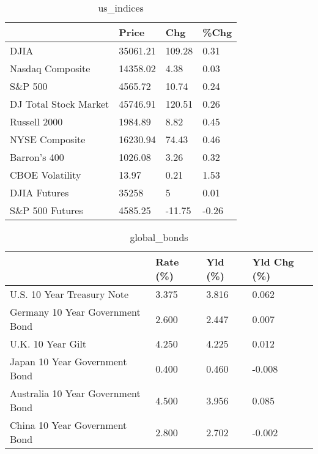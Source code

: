 \documentclass{article}%
\begin{document}
%


\begin{table}[htbp]%
\caption{us\_indices}%
\centering%
\begin{adjustbox}{width=1\textwidth}%
\begin{tabular}{llll}
\toprule
                      &    Price &    Chg &  \%Chg \\
\midrule
                 DJIA & 35061.21 & 109.28 &  0.31 \\
     Nasdaq Composite & 14358.02 &   4.38 &  0.03 \\
              S\&P 500 &  4565.72 &  10.74 &  0.24 \\
DJ Total Stock Market & 45746.91 & 120.51 &  0.26 \\
         Russell 2000 &  1984.89 &   8.82 &  0.45 \\
       NYSE Composite & 16230.94 &  74.43 &  0.46 \\
         Barron's 400 &  1026.08 &   3.26 &  0.32 \\
      CBOE Volatility &    13.97 &   0.21 &  1.53 \\
         DJIA Futures &    35258 &      5 &  0.01 \\
      S\&P 500 Futures &  4585.25 & -11.75 & -0.26 \\
\bottomrule
\end{tabular}
%
\end{adjustbox}%
\end{table}

%


\begin{table}[htbp]%
\caption{global\_bonds}%
\centering%
\begin{adjustbox}{width=1\textwidth}%
\begin{tabular}{llll}
\toprule
                                  & Rate (\%) & Yld (\%) & Yld Chg (\%) \\
\midrule
       U.S. 10 Year Treasury Note &    3.375 &   3.816 &       0.062 \\
  Germany 10 Year Government Bond &    2.600 &   2.447 &       0.007 \\
                U.K. 10 Year Gilt &    4.250 &   4.225 &       0.012 \\
    Japan 10 Year Government Bond &    0.400 &   0.460 &      -0.008 \\
Australia 10 Year Government Bond &    4.500 &   3.956 &       0.085 \\
    China 10 Year Government Bond &    2.800 &   2.702 &      -0.002 \\
\bottomrule
\end{tabular}
%
\end{adjustbox}%
\end{table}
\end{document}
